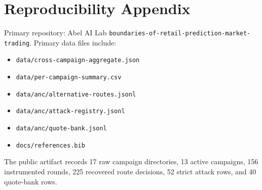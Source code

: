 \documentclass[11pt]{article}
\begin{document}
\section*{Reproducibility Appendix}
Primary repository: Abel AI Lab \texttt{boundaries-of-retail-prediction-market-trading}. Primary data files include:
\begin{itemize}
\item \texttt{data/cross-campaign-aggregate.json}
\item \texttt{data/per-campaign-summary.csv}
\item \texttt{data/anc/alternative-routes.jsonl}
\item \texttt{data/anc/attack-registry.jsonl}
\item \texttt{data/anc/quote-bank.jsonl}
\item \texttt{docs/references.bib}
\end{itemize}
The public artifact records 17 raw campaign directories, 13 active campaigns, 156 instrumented rounds, 225 recovered route decisions, 52 strict attack rows, and 40 quote-bank rows.



\end{document}
